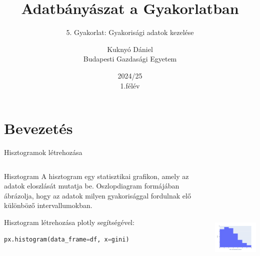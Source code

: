 \documentclass[english, aspectratio=169]{beamer}
\makeatletter
\newcommand\makebeamertitle{\frame{\maketitle}}
\let\origtableofcontents=\tableofcontents
\def\tableofcontents{\@ifnextchar[{\origtableofcontents}{\gobbletableofcontents}}
\def\gobbletableofcontents#1{\origtableofcontents}
\makeatother
\begin{document}
	\section{Bevezetés}
	\title[]{Adatbányászat a Gyakorlatban}
	\subtitle{5. Gyakorlat: Gyakorisági adatok kezelése}
	\author[Kuknyó Dániel]{Kuknyó Dániel\\Budapesti Gazdasági Egyetem}
	\date{2024/25\\1.félév}
	\makebeamertitle
	
	\begin{frame}
	\tableofcontents{}
	\end{frame}
	
	\begin{frame}
	\tableofcontents[currentsection]
	\end{frame}
	
	\begin{frame}[fragile]{Hisztogramok létrehozása}
		\begin{columns}
			\begin{column}{.5\textwidth}
				\begin{block}{Hisztogram}
					A hisztogram egy statisztikai grafikon, amely az adatok eloszlását mutatja be. Oszlopdiagram formájában ábrázolja, hogy az adatok milyen gyakorisággal fordulnak elő különböző intervallumokban.
				\end{block}
				\medskip
				Hisztogram létrehozása plotly segítségével:
				\begin{lstlisting}[language=python]
px.histogram(data_frame=df, x=gini)
				\end{lstlisting}
			\end{column}
			\begin{column}{.5\textwidth}
				\begin{center}
					\includegraphics[width=7cm, height=7cm, keepaspectratio]{images/freq_1.png}
				\end{center}
			\end{column}
		\end{columns}
	\end{frame}
	
\end{document}
